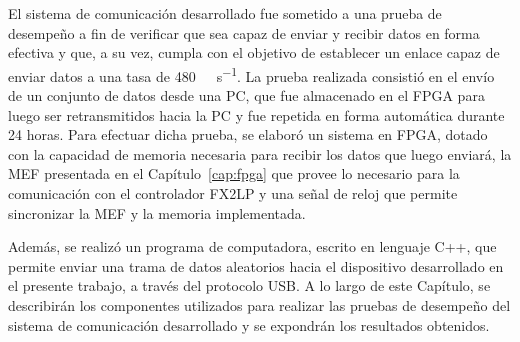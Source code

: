 

El sistema de comunicación desarrollado fue sometido a una prueba de desempeño a fin de verificar que sea capaz de enviar y recibir datos en forma efectiva y que, a su vez, cumpla con el objetivo de establecer un enlace capaz de enviar datos a una tasa de \SI{480}{\mega\bit\per\second}. La prueba realizada consistió en el envío de un conjunto de datos desde una PC, que fue almacenado en el FPGA para luego ser retransmitidos hacia la PC y fue repetida en forma automática durante 24 horas. Para efectuar dicha prueba, se elaboró un sistema en FPGA, dotado con la capacidad de memoria necesaria para recibir los datos que luego enviará, la MEF presentada en el Capítulo~\ref{cap:fpga} que provee lo necesario para la comunicación con el controlador FX2LP y una señal de reloj que permite sincronizar la MEF y la memoria implementada.

Además, se realizó un programa de computadora, escrito en lenguaje C++, que permite enviar una trama de datos aleatorios hacia el dispositivo desarrollado en el presente trabajo, a través del protocolo USB. A lo largo de este Capítulo, se describirán los componentes utilizados para realizar las pruebas de desempeño del sistema de comunicación desarrollado y se expondrán los resultados obtenidos.